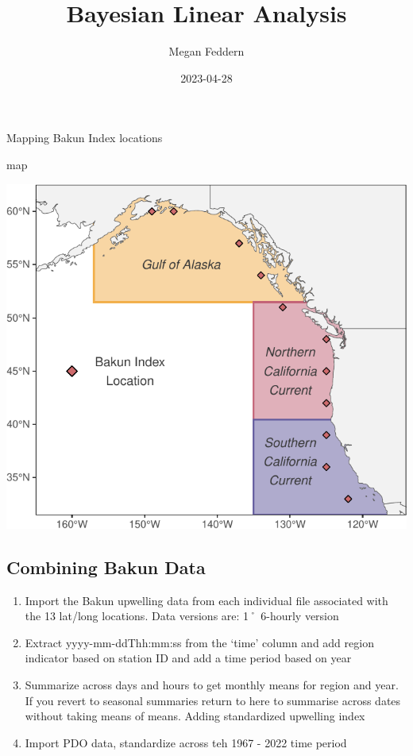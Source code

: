 \documentclass[
]{article}
\title{Bayesian Linear Analysis}
\author{Megan Feddern}
\date{2023-04-28}
\newenvironment{Shaded}{\begin{snugshade}}{\end{snugshade}}
\newcommand{\NormalTok}[1]{#1}
\begin{document}
\maketitle

Mapping Bakun Index locations

\begin{Shaded}
\begin{Highlighting}[]
\NormalTok{map}
\end{Highlighting}
\end{Shaded}

\includegraphics{BayesianLinearModels_files/figure-latex/map2-1.pdf}

\hypertarget{combining-bakun-data}{%
\subsection{Combining Bakun Data}\label{combining-bakun-data}}

\begin{enumerate}
\def\labelenumi{\arabic{enumi})}
\item
  Import the Bakun upwelling data from each individual file associated
  with the 13 lat/long locations. Data versions are: 1˚ 6-hourly version
\item
  Extract yyyy-mm-ddThh:mm:ss from the `time' column and add region
  indicator based on station ID and add a time period based on year
\item
  Summarize across days and hours to get monthly means for region and
  year. If you revert to seasonal summaries return to here to summarise
  across dates without taking means of means. Adding standardized
  upwelling index
\item
  Import PDO data, standardize across teh 1967 - 2022 time period
\end{enumerate}
\end{document}
